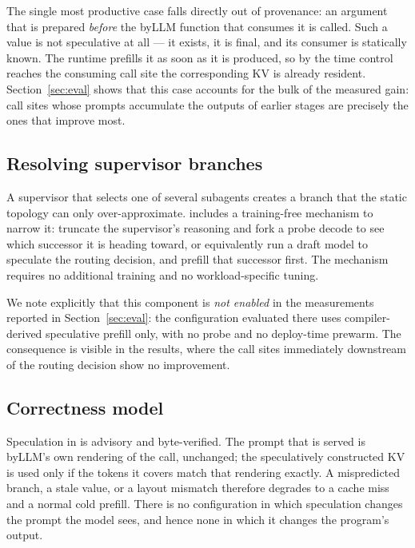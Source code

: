 The single most productive case falls directly out of provenance: an argument
that is prepared \emph{before} the byLLM function that consumes it is called.
Such a value is not speculative at all --- it exists, it is final, and its
consumer is statically known. The runtime prefills it as soon as it is produced,
so by the time control reaches the consuming call site the corresponding KV is
already resident. Section~\ref{sec:eval} shows that this case accounts for the
bulk of the measured gain: call sites whose prompts accumulate the outputs of
earlier stages are precisely the ones that improve most.

\subsection{Resolving supervisor branches}

A supervisor that selects one of several subagents creates a branch that the
static topology can only over-approximate. \sysname{} includes a training-free
mechanism to narrow it: truncate the supervisor's reasoning and fork a probe
decode to see which successor it is heading toward, or equivalently run a draft
model to speculate the routing decision, and prefill that successor first. The
mechanism requires no additional training and no workload-specific tuning.

We note explicitly that this component is \emph{not enabled} in the measurements
reported in Section~\ref{sec:eval}: the configuration evaluated there uses
compiler-derived speculative prefill only, with no probe and no deploy-time
prewarm. The consequence is visible in the results, where the call sites
immediately downstream of the routing decision show no improvement.

\subsection{Correctness model}

Speculation in \sysname{} is advisory and byte-verified. The prompt that is
served is byLLM's own rendering of the call, unchanged; the speculatively
constructed KV is used only if the tokens it covers match that rendering exactly.
A mispredicted branch, a stale value, or a layout mismatch therefore degrades to
a cache miss and a normal cold prefill. There is no configuration in which
speculation changes the prompt the model sees, and hence none in which it changes
the program's output.
